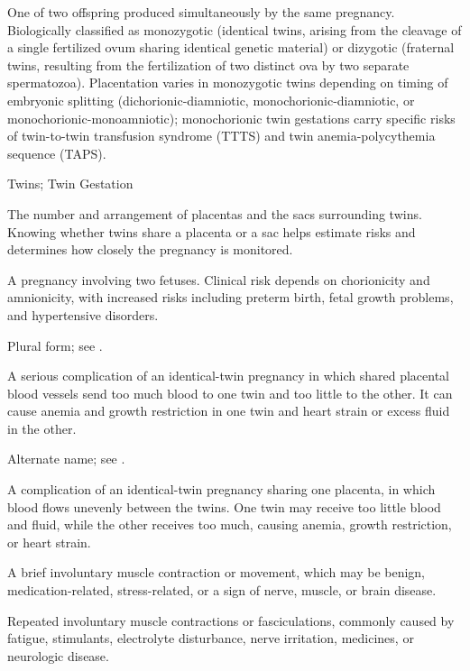  One of two offspring produced simultaneously by the same pregnancy. Biologically classified as monozygotic (identical twins, arising from the cleavage of a single fertilized ovum sharing identical genetic material) or dizygotic (fraternal twins, resulting from the fertilization of two distinct ova by two separate spermatozoa). Placentation varies in monozygotic twins depending on timing of embryonic splitting (dichorionic-diamniotic, monochorionic-diamniotic, or monochorionic-monoamniotic); monochorionic twin gestations carry specific risks of twin-to-twin transfusion syndrome (TTTS) and twin anemia-polycythemia sequence (TAPS).

\synonyms
Twins; Twin Gestation

 The number and arrangement of placentas and the sacs surrounding twins. Knowing whether twins share a placenta or a sac helps estimate risks and determines how closely the pregnancy is monitored.

 A pregnancy involving two fetuses. Clinical risk depends on chorionicity and amnionicity, with increased risks including preterm birth, fetal growth problems, and hypertensive disorders.

 Plural form; see .

 A serious complication of an identical-twin pregnancy in which shared placental blood vessels send too much blood to one twin and too little to the other. It can cause anemia and growth restriction in one twin and heart strain or excess fluid in the other.

 Alternate name; see .

 A complication of an identical-twin pregnancy sharing one placenta, in which blood flows unevenly between the twins. One twin may receive too little blood and fluid, while the other receives too much, causing anemia, growth restriction, or heart strain.

 A brief involuntary muscle contraction or movement, which may be benign, medication-related, stress-related, or a sign of nerve, muscle, or brain disease.

 Repeated involuntary muscle contractions or fasciculations, commonly caused by fatigue, stimulants, electrolyte disturbance, nerve irritation, medicines, or neurologic disease.

